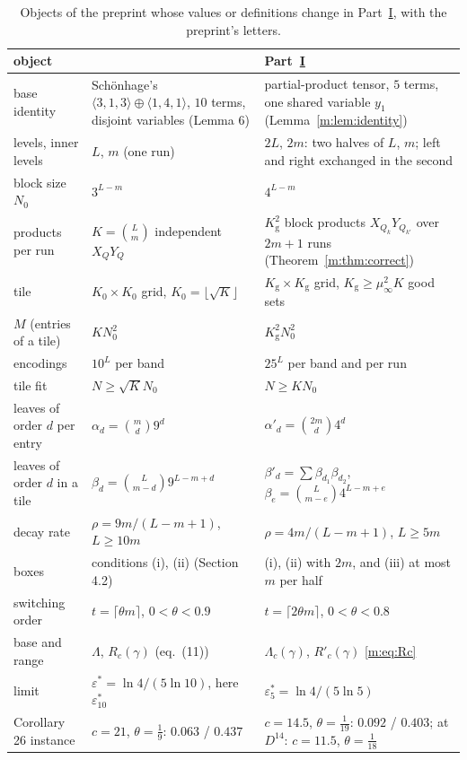 \documentclass[11pt]{article}
\theoremstyle{definition}
\theoremstyle{remark}
\newcommand{\Nz}{N_0}
\newcommand{\Kg}{K_{\mathrm g}}
\newcommand{\es}{\varepsilon^*_5}
\newcommand{\et}{\varepsilon^*_{10}}
\begin{document}
\begin{table}[ht]
\centering\small
\renewcommand{\arraystretch}{1.12}\setlength{\tabcolsep}{4pt}
\begin{tabular}{@{}>{\raggedright}p{}>{\raggedright}p{}>{\raggedright\arraybackslash}p{}@{}}
object & \cite{ZT} & Part~\hyperref[m:partI]{I}\\\hline
base identity & Schönhage's $\langle3,1,3\rangle\oplus\langle1,4,1\rangle$, $10$ terms, disjoint variables (Lemma 6) & partial-product tensor, $5$ terms, one shared variable $y_1$ (Lemma~\ref{m:lem:identity})\\
levels, inner levels & $L$, $m$ (one run) & $2L$, $2m$: two halves of $L$, $m$; left and right exchanged in the second\\
block size $\Nz$ & $3^{L-m}$ & $4^{L-m}$\\
products per run & $K=\binom Lm$ independent $X_QY_Q$ & $\Kg^2$ block products $X_{Q_k}Y_{Q_{k'}}$ over $2m+1$ runs (Theorem~\ref{m:thm:correct})\\
tile & $K_0\times K_0$ grid, $K_0=\lfloor\sqrt K\rfloor$ & $\Kg\times\Kg$ grid, $\Kg\ge\mu_\infty^2K$ good sets\\
$M$ (entries of a tile) & $K\Nz^2$ & $\Kg^2\Nz^2$\\
encodings & $10^L$ per band & $25^L$ per band and per run\\
tile fit & $N\ge\sqrt K\Nz$ & $N\ge K\Nz$\\
leaves of order $d$ per entry & $\alpha_d=\binom md9^d$ & $\alpha'_d=\binom{2m}d4^d$\\
leaves of order $d$ in a tile & $\beta_d=\binom L{m-d}9^{L-m+d}$ & $\beta'_d=\sum\beta_{d_1}\beta_{d_2}$, $\beta_e=\binom L{m-e}4^{L-m+e}$\\
decay rate & $\rho=9m/(L-m+1)$, $L\ge10m$ & $\rho=4m/(L-m+1)$, $L\ge5m$\\
boxes & conditions (i), (ii) (Section 4.2) & (i), (ii) with $2m$, and (iii) at most $m$ per half\\
switching order & $t=\lceil\theta m\rceil$, $0<\theta<0.9$ & $t=\lceil2\theta m\rceil$, $0<\theta<0.8$\\
base and range & $\Lambda$, $R_c(\gamma)$ (eq.~(11)) & $\Lambda_c(\gamma)$, $R'_c(\gamma)$ \eqref{m:eq:Rc}\\
limit & $\varepsilon^*=\ln4/(5\ln10)$, here $\et$ & $\es=\ln4/(5\ln5)$\\
Corollary 26 instance & $c=21$, $\theta=\frac19$: $0.063$ / $0.437$ & $c=14.5$, $\theta=\frac1{19}$: $0.092$ / $0.403$; at $D^{14}$: $c=11.5$, $\theta=\frac1{18}$
\end{tabular}
\caption{Objects of the preprint whose values or definitions change in Part~\hyperref[m:partI]{I}, with the preprint's letters.}
\label{c:tab:objects}
\end{table}
\end{document}
